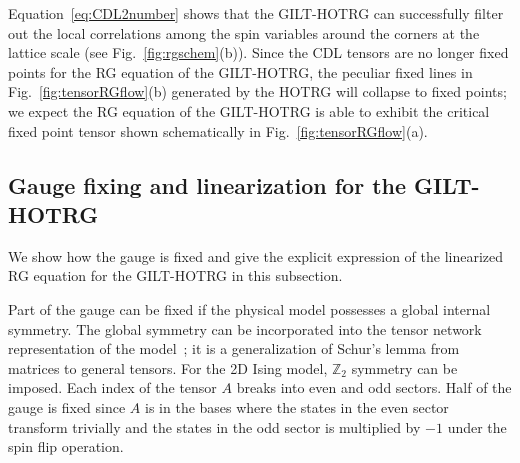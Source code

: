 \documentclass[aps,prr,reprint,superscriptaddress,floatfix]{revtex4-2}
\begin{document}
Equation~\eqref{eq:CDL2number} shows that the GILT-HOTRG can successfully filter out the local correlations among the spin variables around the corners at the lattice scale (see Fig.~\ref{fig:rgschem}(b)).
Since the CDL tensors are no longer fixed points for the RG equation of the GILT-HOTRG, the peculiar fixed lines in Fig.~\ref{fig:tensorRGflow}(b) generated by the HOTRG will collapse to fixed points; we expect the RG equation of the GILT-HOTRG is able to exhibit the critical fixed point tensor shown schematically in Fig.~\ref{fig:tensorRGflow}(a).
%

\subsection{Gauge fixing and linearization for the GILT-HOTRG\label{sec:gaugefix}}
We show how the gauge is fixed and give the explicit expression of the linearized RG equation for the GILT-HOTRG in this subsection.
%

Part of the gauge can be fixed if the physical model possesses a global internal symmetry.
The global symmetry can be incorporated into the tensor network representation of the model~\cite{Singh2010SymTen,Singh2011U1Ten,Singh2012SU2Ten}; it is a generalization of Schur's lemma from matrices to general tensors.
For the 2D Ising model, $\mathbb{Z}_2$ symmetry can be imposed.
Each index of the tensor $A$ breaks into even and odd sectors.
Half of the gauge is fixed since $A$ is in the bases where the states in the even sector transform trivially and
the states in the odd sector is multiplied by $-1$ under the spin flip operation.
%
\end{document}
